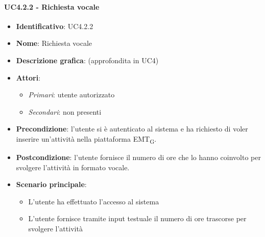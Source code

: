 \paragraph{UC4.2.2 - Richiesta vocale}
\begin{itemize}
   \item \textbf{Identificativo}: UC4.2.2
   \item \textbf{Nome}: Richiesta vocale
   \item \textbf{Descrizione grafica}: (approfondita in UC4)
   \item \textbf{Attori}:
   \begin{itemize} 
       \item \textit{Primari}: utente autorizzato
       \item \textit{Secondari}: non presenti
   \end{itemize}
       \item \textbf{Precondizione}: l'utente si è autenticato al sistema e ha richiesto di voler inserire un'attività nella piattaforma EMT\textsubscript{G}. 
       \item \textbf{Postcondizione}: l'utente fornisce il numero di ore che lo hanno coinvolto per svolgere l'attività in formato vocale.
    \item \textbf{Scenario principale}: 
       \begin{itemize}
           \item L'utente ha effettuato l'accesso al sistema 
           \item L'utente fornisce tramite input testuale il numero di ore trascorse per svolgere l'attività
       \end{itemize}
\end{itemize}

